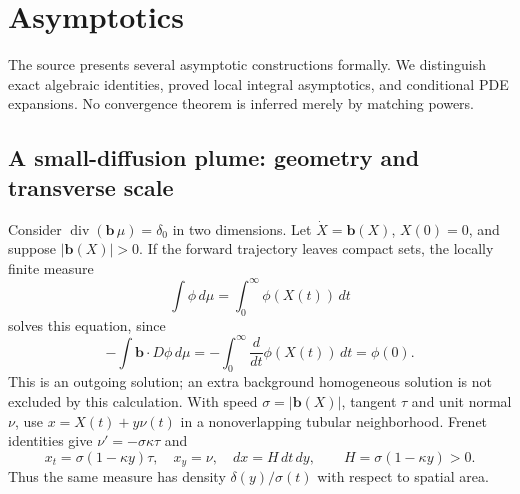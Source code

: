 \Needspace{65mm}
\section{Asymptotics}\label{sec:4-5}
The source presents several asymptotic constructions formally.
We distinguish exact algebraic identities, proved local integral
asymptotics, and conditional PDE expansions.
No convergence theorem is inferred merely by matching powers.

\Needspace{35mm}
\subsection{A small-diffusion plume: geometry and transverse scale}
Consider $\operatorname{div}(\mathbf b\,\mu)=\delta_0$ in two dimensions.
Let $\dot X=\mathbf b(X)$, $X(0)=0$, and suppose $|\mathbf b(X)|>0$.
If the forward trajectory leaves compact sets, the locally finite measure
\[
 \int\phi\,d\mu=\int_0^\infty\phi(X(t))\,dt
\]
solves this equation, since
\[
 -\int\mathbf b\cdot D\phi\,d\mu
 =-\int_0^\infty\frac d{dt}\phi(X(t))\,dt=\phi(0).
\]
This is an outgoing solution; an extra background homogeneous solution
is not excluded by this calculation.
With speed $\sigma=|\mathbf b(X)|$, tangent $\tau$ and unit normal $\nu$,
use $x=X(t)+y\nu(t)$ in a nonoverlapping tubular neighborhood.
Frenet identities give $\nu'=-\sigma\kappa\tau$ and
\[
 x_t=\sigma(1-\kappa y)\tau,\quad x_y=\nu,\quad
 dx=H\,dt\,dy,\qquad H=\sigma(1-\kappa y)>0.
\]
Thus the same measure has density $\delta(y)/\sigma(t)$ with respect
to spatial area.
\Needspace{45mm}

